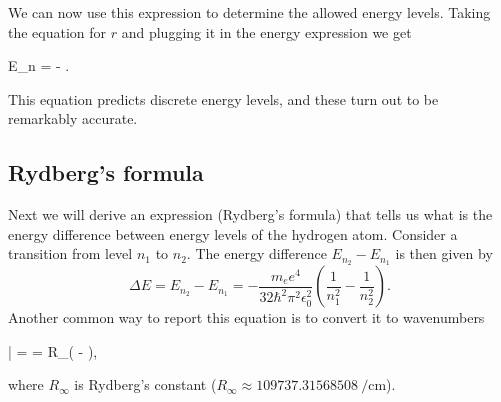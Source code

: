 We can now use this expression to determine the allowed energy levels.
Taking the equation for $r$ and plugging it in the energy expression we get
\begin{iequation}
E_n = - .
\end{iequation}
This equation predicts discrete energy levels, and these turn out to be remarkably accurate.

\subsection{Rydberg's formula}
Next we will derive an expression (Rydberg's formula) that tells us what is the energy difference between energy levels of the hydrogen atom.
Consider a transition from level $n_1$ to $n_2$.
The energy difference $E_{n_2} - E_{n_1}$ is then given by
\begin{equation}
\Delta E = E_{n_2} - E_{n_1} = - \frac{m_e e^4}{32\hbar^2 \pi^2 \epsilon_0^2 } \left(\frac{1}{n_1^2} - \frac{1}{n_2^2} \right).
\end{equation}
Another common way to report this equation is to convert it to wavenumbers
\begin{iequation}
\bar{\nu} =  = R_\infty \left( -  \right),
\end{iequation}
where $R_\infty$ is Rydberg's constant ($R_\infty \approx \SI{109737.31568508}{\per\centi\meter}$).

